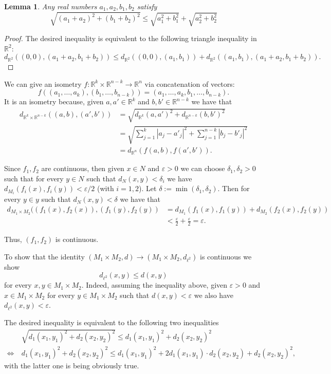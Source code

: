 \documentclass[12pt]{article}
\newtheorem{lemma}{Lemma}
\newcommand\itemc{\item[(c)]}
\renewcommand\|{\ | \ }
\newcommand\ra{\rightarrow}
\newcommand\R{\mathbb{R}}
\newcommand\ltwo{\ell^2}
\newcommand\e\varepsilon
\begin{document}
\begin{lemma}
\label{lem:minkowski}
Any real numbers $a_1, a_2, b_1, b_2$ satisfy
\[
\sqrt{(a_1 + a_2)^2 + (b_1 + b_2)^2} \leq
\sqrt{a_1^2 + b_1^2} + \sqrt{a_2^2 + b_2^2}
\]
\end{lemma}

\begin{proof}
The desired inequality is equivalent to the following triangle inequality in 
$\R^2$:
\[
d_{\R^2}((0, 0), (a_1 + a_2, b_1 + b_2)) \leq
d_{\R^2}((0, 0), (a_1, b_1)) + d_{\R^2}((a_1, b_1), (a_1 + a_2, b_1 + b_2)).
\]
\end{proof}

We can give an isometry $f: \R^k \times \R^{n-k} \ra \R^n$ via concatenation
of vectors:
\[
f((a_1, \ldots, a_k), (b_1, \ldots, b_{n - k}))
	= (a_1, \ldots, a_k, b_1, \ldots, b_{n - k}).
\]
It is an isometry because, given $a, a'\in \R^k$ and $b, b'\in \R^{n-k}$ we
have that
\begin{align*}
d_{\R^k \times \R^{n - k}}((a, b), (a', b'))
& = \sqrt{d_{\R^k}(a, a')^2 + d_{\R^{n - k}}(b, b')^2} \\
& = \sqrt{\sum_{j = 1}^k|a_j - a'_j|^2
+ \sum_{j = 1}^{n - k} |b_j - b'_j|^2} \\
& = d_{\R^n}(f(a, b), f(a', b')).
\end{align*}

\itemc
Since $f_1, f_2$ are continuous, then given $x \in N$ and $\e > 0$
we can choose $\delta_1, \delta_2 > 0$ such that
for every $y \in N$ such that $d_{N}(x, y) < \delta_i$ we have 
$d_{M_i}(f_i(x), f_i(y)) < \e/2$ (with $i = 1, 2$).
Let $\delta := \min(\delta_1, \delta_2)$.
Then for every $y \in y$ such that $d_N(x, y) < \delta$ we have that
\begin{align*}
d_{M_1 \times M_2}((f_1(x), f_2(x)), (f_1(y), f_2(y)) 
& = d_{M_1}(f_1(x), f_1(y)) + d_{M_2}(f_2(x), f_2(y)) \\
& < \frac \e 2 + \frac \e 2 = \e.
\end{align*}

Thus, $(f_1, f_2)$ is continuous.

To show that the identity $(M_1 \times M_2, d) \ra (M_1 \times M_2, d_{\ltwo})$
is continuous we show 
\[
d_{\ltwo}(x, y) \leq d(x, y)
\]
for every $x, y \in M_1 \times M_2$. Indeed, assuming the inequality above,
given $\e > 0$ and $x \in M_1 \times M_2$ for every 
$y \in M_1 \times M_2$ such that $d(x, y) < \e$ we also have
$d_{\ltwo}(x, y) < \e$.

The desired inequality is equivalent to the following two inequalities
\begin{align*}
& \sqrt{d_1(x_1, y_1)^2 + d_2(x_2, y_2)^2}
\leq d_1(x_1, y_1)^2 + d_2(x_2, y_2)^2 \\
\iff\> & d_1(x_1, y_1)^2 + d_2(x_2, y_2)^2
\leq d_1(x_1, y_1)^2 + 2 d_1(x_1, y_1) \cdot d_2(x_2, y_2)
	+ d_2(x_2, y_2)^2,
\end{align*}
with the latter one is being obviously true.
\end{document}
